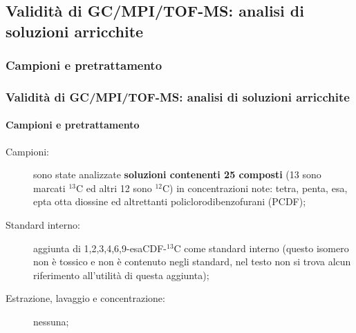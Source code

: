 \subsection{Validità di GC/MPI/TOF-MS: analisi di soluzioni arricchite}\subsubsection{Campioni e pretrattamento}\begin{frame}\frametitle{Validità di GC/MPI/TOF-MS: analisi di soluzioni arricchite}\framesubtitle{Campioni e pretrattamento}
\begin{description}
\item [{Campioni:}] sono state analizzate {\bf soluzioni contenenti 25 composti} (13 sono marcati $^{13}$C ed altri 12 sono $^{12}$C) in concentrazioni note: tetra, penta, esa, epta otta diossine ed altrettanti policlorodibenzofurani (PCDF);\pause
\item [{Standard interno:}] aggiunta di 1,2,3,4,6,9-esaCDF-$^{13}$C come standard interno (questo isomero non è tossico e non è contenuto negli standard, nel testo non si trova alcun riferimento all'utilità di questa aggiunta);
\item [{Estrazione, lavaggio e concentrazione:}] nessuna;
\end{description}
\end{frame}

\logo{}



